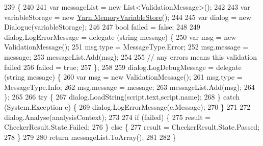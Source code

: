 \begin{DoxyCode}
239                                                                                                            
                        \{
240 
241             var messageList = \textcolor{keyword}{new} List<ValidationMessage>();
242 
243             var variableStorage = \textcolor{keyword}{new} \hyperlink{a00052}{Yarn.MemoryVariableStore}();
244 
245             var dialog = \textcolor{keyword}{new} Dialogue(variableStorage);
246 
247             \textcolor{keywordtype}{bool} failed = \textcolor{keyword}{false};
248 
249             dialog.LogErrorMessage = delegate (\textcolor{keywordtype}{string} message) \{
250                 var msg = \textcolor{keyword}{new} ValidationMessage();
251                 msg.type = MessageType.Error;
252                 msg.message = message;
253                 messageList.Add(msg);
254 
255                 \textcolor{comment}{// any errors means this validation failed}
256                 failed = \textcolor{keyword}{true};
257             \};
258 
259             dialog.LogDebugMessage = delegate (\textcolor{keywordtype}{string} message) \{
260                 var msg = \textcolor{keyword}{new} ValidationMessage();
261                 msg.type = MessageType.Info;
262                 msg.message = message;
263                 messageList.Add(msg);
264             \};
265 
266             \textcolor{keywordflow}{try} \{
267                 dialog.LoadString(script.text,script.name);
268             \} \textcolor{keywordflow}{catch} (System.Exception e) \{
269                 dialog.LogErrorMessage(e.Message);
270             \}
271 
272             dialog.Analyse(analysisContext);
273 
274             \textcolor{keywordflow}{if} (failed) \{
275                 result = CheckerResult.State.Failed;
276             \} \textcolor{keywordflow}{else} \{
277                 result = CheckerResult.State.Passed;
278             \}
279 
280             \textcolor{keywordflow}{return} messageList.ToArray();
281 
282         \}
\end{DoxyCode}


